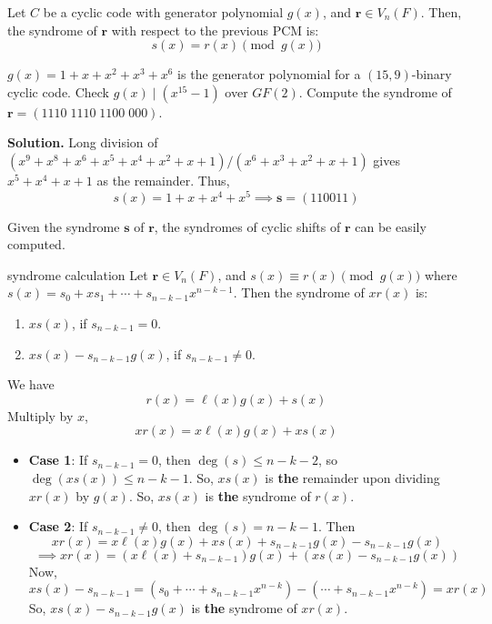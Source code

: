 \begin{Theorem}{}{}
    Let $ C $ be a cyclic code with generator polynomial $ g(x) $, and $ \symbf{r}\in V_n(F) $.
    Then, the syndrome of $ \symbf{r} $ with respect to the previous PCM is:
    \[ s(x)=r(x)\pmod{g(x)} \]
\end{Theorem}

\begin{Example}{}{}
    $ g(x)=1+x+x^2+x^3+x^6 $ is the generator polynomial for a $ (15,9) $-binary cyclic code.
    Check $ g(x)\mid (x^{15}-1) $ over $ GF(2) $. Compute the syndrome of
    $ \symbf{r}=(1110\; 1110\; 1100\; 000) $.

    \textbf{Solution.} Long division of $ (x^9+x^8+x^6+x^5+x^4+x^2+x+1)/(x^6+x^3+x^2+x+1) $
    gives $ x^5+x^4+x+1 $ as the remainder. Thus,
    \[ s(x)=1+x+x^4+x^5\implies \symbf{s}=(110011) \]
\end{Example}

\begin{Remark}{}{}
    Given the syndrome $ \symbf{s} $ of $ \symbf{r} $, the syndromes of cyclic shifts of $ \symbf{r} $
    can be easily computed.
\end{Remark}

\begin{Theorem}{}{syndrome calculation}
    Let $ \symbf{r}\in V_n(F) $, and $ s(x) \equiv r(x)\pmod{g(x)} $ where
    $ s(x) = s_0+xs_1+\cdots+s_{n-k-1}x^{n-k-1} $.
    Then the syndrome of $ xr(x) $ is:
    \begin{enumerate}[label=(\roman*)]
        \item $ xs(x) $, if $ s_{n-k-1}=0 $.
        \item $ xs(x)-s_{n-k-1}g(x) $, if $ s_{n-k-1}\neq 0 $.
    \end{enumerate}
\end{Theorem}

\begin{Proof}{}{}
    We have
    \[ r(x)=\ell (x)g(x)+s(x) \]
    Multiply by $ x $,
    \[ xr(x)=x\ell(x)g(x)+xs(x) \]
    \begin{itemize}
        \item \textbf{Case 1}: If $ s_{n-k-1}=0 $, then $ \deg(s)\leqslant n-k-2 $,
              so $ \deg(xs(x))\leqslant n-k-1 $. So, $ xs(x) $ is \textbf{the} remainder upon dividing
              $ xr(x) $ by $ g(x) $. So, $ xs(x) $ is \textbf{the} syndrome of $ r(x) $.
        \item \textbf{Case 2}: If $ s_{n-k-1}\neq 0 $, then $ \deg(s)=n-k-1 $. Then
              \[ xr(x)=x\ell(x)g(x)+xs(x)+s_{n-k-1}g(x)-s_{n-k-1}g(x) \]
              \[ \implies xr(x)=(x\ell(x)+s_{n-k-1})g(x)+(xs(x)-s_{n-k-1}g(x)) \]
              Now,
              \[ xs(x)-s_{n-k-1}=(s_0+\cdots+s_{n-k-1}x^{n-k})-(\cdots+s_{n-k-1}x^{n-k})=xr(x) \]
              So, $ xs(x)-s_{n-k-1}g(x) $ is \textbf{the} syndrome of $ xr(x) $.
    \end{itemize}
\end{Proof}
